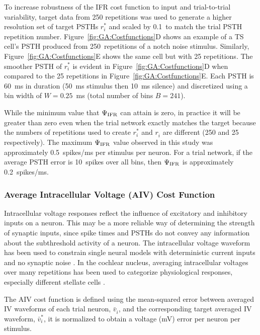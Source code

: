 \smallskip{}

To increase robustness of the IFR cost function to input and
trial-to-trial variability, target data from 250 repetitions was used
to generate a higher resolution set of target PSTHs $r_{i}^{*}$ and
scaled by 0.1~to match the trial PSTH repetition
number. Figure~\ref{fig:GA:Costfunctions}D shows an example of a TS
cell's PSTH produced from 250~repetitions of a notch noise
stimulus. Similarly, Figure~\ref{fig:GA:Costfunctions}E shows the same
cell but with 25 repetitions. The smoother PSTH of $r_{i}^{*}$ is
evident in Figure~\ref{fig:GA:Costfunctions}D when compared to the 25
repetitions in Figure~\ref{fig:GA:Costfunctions}E. Each PSTH is 60~ms
in duration (50~ms stimulus then 10~ms silence) and discretized using
a bin width of $W=0.25$~ms (total number of bins $B=241$).

\smallskip{}

While the minimum value that $\Psi_{{\rm IFR}}$ can attain is zero, in
practice it will be greater than zero even when the trial network
exactly matches the target because the numbers of repetitions used to
create $r_{i}^{*}$ and $r_{i}^{}$ are different (250 and 25
respectively). The maximum $\Psi_{{\rm IFR}}$ value observed in this
study was approximately 0.5~spikes/ms per stimulus per neuron. For a
trial network, if the average PSTH error is 10~spikes over all bins,
then $\Psi_{{\rm IFR}} $ is approximately 0.2~spikes/ms.

\subsubsection{Average Intracellular Voltage (AIV) Cost Function}\label{sec:GA:aver-intr-volt-cost-fn}

Intracellular voltage responses reflect the influence of excitatory
and inhibitory inputs on a neuron. This may be a more reliable way of
determining the strength of synaptic inputs, since spike times and
PSTHs do not convey any information about the subthreshold activity of
a neuron. The intracellular voltage waveform has been used to
constrain single neural models with deterministic current inputs and
no synaptic noise \citep{KerenPeledEtAl:2005,VanierBower:1999}. In the
cochlear nucleus, averaging intracellular voltages over many
repetitions has been used to categorize physiological responses,
especially different stellate cells
\citep{PaoliniClareyEtAl:2004,PaoliniClareyEtAl:2005}.

\smallskip{}

The AIV cost function is defined using the mean-squared error between
averaged IV waveforms of each trial neuron, $\bar{v}_{i}^{}$, and the
corresponding target averaged IV waveform, $\bar{v}_{i}^{*}$, it is
normalized to obtain a voltage (mV) error per neuron per stimulus.

